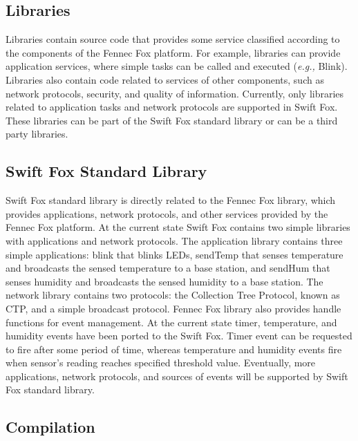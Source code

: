 \subsection{Libraries}

Libraries contain source code that provides some service classified
according to the components of the Fennec Fox platform. For example,
libraries can provide application services, where simple tasks can be
called and executed (\textit{e.g.,} Blink). Libraries also contain code
related to services of other components, such as network protocols,
security, and quality of information. Currently, only libraries related to 
application tasks and network protocols are supported in Swift Fox. These
libraries can be part of the Swift Fox standard library or can be a third
party libraries. 

\subsection{Swift Fox Standard Library}

Swift Fox standard library is directly related to the Fennec Fox library,
which provides applications, network protocols, and other services
provided by the Fennec Fox platform. At the current state Swift Fox 
contains two simple libraries with applications and network protocols. The
application library contains three simple applications: blink that blinks 
LEDs, sendTemp that senses temperature and broadcasts the sensed temperature to a 
base station, and sendHum that senses humidity and broadcasts the sensed
humidity to a base station. The network library contains two protocols:
the Collection Tree Protocol, known as CTP, and a simple broadcast protocol.
Fennec Fox library also provides handle functions for event management.
At the current state timer, temperature, and humidity events have been 
ported to the Swift Fox. Timer event can be requested to fire after some 
period of time, whereas temperature and humidity events fire when
sensor's reading reaches specified threshold value.
Eventually, more applications, network protocols, and sources 
of events will be supported by Swift Fox standard library.

\subsection{Compilation}
\label{sec:compilation}

